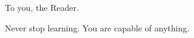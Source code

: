 \frontmatter


\cleardoublepage\newpage\thispagestyle{empty}\null
\cleardoublepage\newpage
\thispagestyle{empty}

\begin{center}
To you, the Reader.

Never stop learning. You are capable of anything.
\end{center}

\setlength{\abovedisplayskip}{-5pt}
\setlength{\abovedisplayshortskip}{-5pt}
